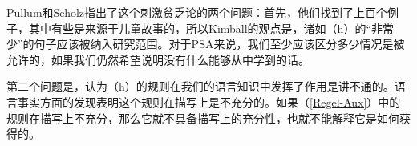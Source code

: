 
Pullum和Scholz指出了这个刺激贫乏论的两个问题：首先，他们找到了上百个例子，其中有些是来源于儿童故事的，所以Kimball的观点是，诸如（h）的“非常少”的句子应该被纳入研究范围。对于PSA来说，我们至少应该区分多少情况是被允许的，如果我们仍然希望说明没有什么能够从中学到的话\citep[]{PS2002a}。

第二个问题是，认为（h）的规则在我们的语言知识中发挥了作用是讲不通的。语言事实方面的发现表明这个规则在描写上是不充分的。如果（\ref{Regel-Aux}）中的规则在描写上不充分，那么它就不具备描写上的充分性，也就不能解释它是如何获得的。

